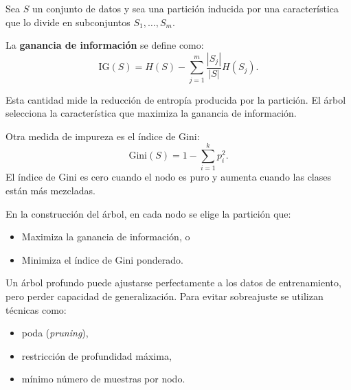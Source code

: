 \documentclass[a4,11pt]{aleph-notas}
\begin{document}
\begin{defi}
Sea \(S\) un conjunto de datos y sea una partición inducida por una característica que lo divide en subconjuntos \(S_1,\ldots,S_m\).  

La \textbf{ganancia de información} se define como:
\[
\mathrm{IG}(S) = H(S) - \sum_{j=1}^{m} \frac{|S_j|}{|S|} H(S_j).
\]

Esta cantidad mide la reducción de entropía producida por la partición.  
El árbol selecciona la característica que maximiza la ganancia de información.
\end{defi}

\begin{defi}
Otra medida de impureza es el índice de Gini:
\[
\mathrm{Gini}(S) = 1 - \sum_{i=1}^{k} p_i^2.
\]
El índice de Gini es cero cuando el nodo es puro y aumenta cuando las clases están más mezcladas.
\end{defi}

\begin{advertencia}
En la construcción del árbol, en cada nodo se elige la partición que:
\begin{itemize}
    \item Maximiza la ganancia de información, o
    \item Minimiza el índice de Gini ponderado.
\end{itemize}
\end{advertencia}

\begin{advertencia}
Un árbol profundo puede ajustarse perfectamente a los datos de entrenamiento, pero perder capacidad de generalización.  
Para evitar sobreajuste se utilizan técnicas como:
\begin{itemize}
    \item poda (\emph{pruning}),
    \item restricción de profundidad máxima,
    \item mínimo número de muestras por nodo.
\end{itemize}
\end{advertencia}
\end{document}
